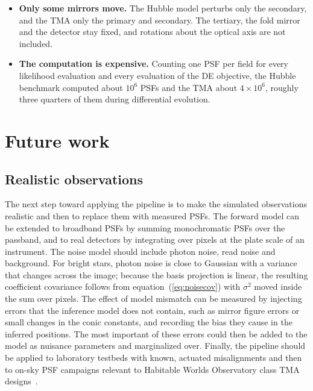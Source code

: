 \begin{itemize}
    \item \textbf{Only some mirrors move.} The Hubble model perturbs only the secondary, and the TMA only the primary and secondary. The tertiary, the fold mirror and the detector stay fixed, and rotations about the optical axis are not included.
    \item \textbf{The computation is expensive.} Counting one PSF per field for every likelihood evaluation and every evaluation of the DE objective, the Hubble benchmark computed about $10^6$ PSFs and the TMA about $4\times10^6$, roughly three quarters of them during differential evolution.
\end{itemize}

\section{Future work}\label{sec:conc_future}

\subsection{Realistic observations}
The next step toward applying the pipeline is to make the simulated observations realistic and then to replace them with measured PSFs. The forward model can be extended to broadband PSFs by summing monochromatic PSFs over the passband, and to real detectors by integrating over pixels at the plate scale of an instrument. The noise model should include photon noise, read noise and background. For bright stars, photon noise is close to Gaussian with a variance that changes across the image; because the basis projection is linear, the resulting coefficient covariance follows from equation~(\ref{eq:noisecov}) with $\sigma^2$ moved inside the sum over pixels. The effect of model mismatch can be measured by injecting errors that the inference model does not contain, such as mirror figure errors or small changes in the conic constants, and recording the bias they cause in the inferred positions. The most important of these errors could then be added to the model as nuisance parameters and marginalized over. Finally, the pipeline should be applied to laboratory testbeds with known, actuated misalignments and then to on-sky PSF campaigns relevant to Habitable Worlds Observatory class TMA designs~\citep{HWO2023}.

